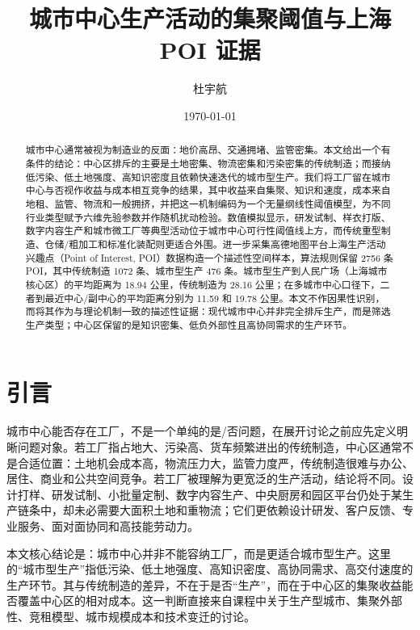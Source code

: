 \documentclass[aps,prl,reprint,superscriptaddress,floatfix,nofootinbib,longbibliography,amsmath,amssymb]{revtex4-2}
\begin{document}
\title{城市中心生产活动的集聚阈值与上海 POI 证据}

\author{杜宇航}

\date{\today}

\begin{abstract}
城市中心通常被视为制造业的反面：地价高昂、交通拥堵、监管密集。本文给出一个有条件的结论：中心区排斥的主要是土地密集、物流密集和污染密集的传统制造；而接纳低污染、低土地强度、高知识密度且依赖快速迭代的城市型生产。我们将工厂留在城市中心与否视作收益与成本相互竞争的结果，其中收益来自集聚、知识和速度，成本来自地租、监管、物流和一般拥挤，并把这一机制编码为一个无量纲线性阈值模型，为不同行业类型赋予六维先验参数并作随机扰动检验。数值模拟显示，研发试制、样衣打版、数字内容生产和城市微工厂等典型活动位于城市中心可行性阈值线上方，而传统重型制造、仓储/粗加工和标准化装配则更适合外围。进一步采集高德地图平台上海生产活动兴趣点（Point of Interest, POI）数据构造一个描述性空间样本，算法规则保留 2756 条 POI，其中传统制造 1072 条、城市型生产 476 条。城市型生产到人民广场（上海城市核心区）的平均距离为 18.94 公里，传统制造为 28.16 公里；在多城市中心口径下，二者到最近中心/副中心的平均距离分别为 11.59 和 19.78 公里。本文不作因果性识别，而将其作为与理论机制一致的描述性证据：现代城市中心并非完全排斥生产，而是筛选生产类型；中心区保留的是知识密集、低负外部性且高协同需求的生产环节。
\end{abstract}

\maketitle

\section{引言}

城市中心能否存在工厂，不是一个单纯的是/否问题，在展开讨论之前应先定义明晰问题对象。若工厂指占地大、污染高、货车频繁进出的传统制造，中心区通常不是合适位置：土地机会成本高，物流压力大，监管力度严，传统制造很难与办公、居住、商业和公共空间竞争。若工厂被理解为更宽泛的生产活动，结论将不同。设计打样、研发试制、小批量定制、数字内容生产、中央厨房和园区平台仍处于某生产链条中，却未必需要大面积土地和重物流；它们更依赖设计研发、客户反馈、专业服务、面对面协同和高技能劳动力。

本文核心结论是：城市中心并非不能容纳工厂，而是更适合城市型生产。这里的``城市型生产''指低污染、低土地强度、高知识密度、高协同需求、高交付速度的生产环节。其与传统制造的差异，不在于是否``生产''，而在于中心区的集聚收益能否覆盖中心区的相对成本。这一判断直接来自课程中关于生产型城市、集聚外部性、竞租模型、城市规模成本和技术变迁的讨论\cite{lec2,lec4,lec5,lec7,lec8,lec10}。
\end{document}
